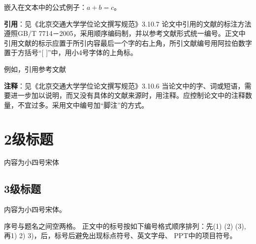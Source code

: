 嵌入在文本中的公式例子：$a + b = c$。



\textbf{引用}：见《北京交通大学学位论文撰写规范》3.10.7
论文中引用的文献的标注方法遵照GB/T 7714－2005，采用顺序编码制，并以参考文献形式统一编号。正文中引用文献的标示应置于所引内容最后一个字的右上角，所引文献编号用阿拉伯数字置于方括号“[ ]”中，用小4号字体的上角标。

例如，引用参考文献\cite{MATSUMURA2017566,fang2015survey}


\textbf{注释}：见《北京交通大学学位论文撰写规范》3.10.6
当论文中的字、词或短语，需要进一步加以说明，而又没有具体的文献来源时，用注释。应控制论文中的注释数量，不宜过多。采用文中编号加“脚注”的方式。



\section{2级标题}
内容为小四号宋体


\subsection{3级标题}
内容为小四号宋体。

序号与题名之间空两格。
正文中的标号按如下编号格式顺序排列：先(1) (2) (3), 再1) 2) 3)，后，标号后避免出现标点符号、英文字母、 PPT中的项目符号。
